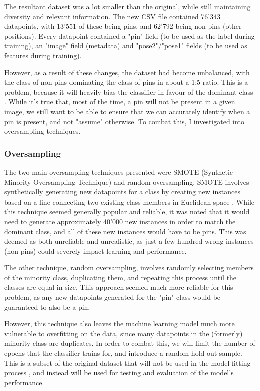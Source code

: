 \documentclass[a4paper, oneside, 11pt]{article}
\begin{document}
\bigskip
\noindent
The resultant dataset was a lot smaller than the original, while still maintaining diversity and relevant information. The new CSV file contained 76'343 datapoints, with 13'551 of these being pins, and 62'792 being non-pins (other positions). Every datapoint contained a "pin" field (to be used as the label during training), an "image" field (metadata) and "pose2"/"pose1" fields (to be used as features during training).

\bigskip
\noindent
However, as a result of these changes, the dataset had become unbalanced, with the class of non-pins dominating the class of pins in about a 1:5 ratio. This is a problem, because it will heavily bias the classifier in favour of the dominant class \cite{ImbalancedDataset}. While it's true that, most of the time, a pin will not be present in a given image, we still want to be able to ensure that we can accurately identify when a pin is present, and not "assume" otherwise. To combat this, I investigated into oversampling techniques.

\subsubsection{Oversampling}

The two main oversampling techniques presented were SMOTE (Synthetic Minority Oversampling Technique) and random oversampling. SMOTE involves synthetically generating new datapoints for a class by creating new instances based on a line connecting two existing class members in Euclidean space \cite{SMOTE}. While this technique seemed generally popular and reliable, it was noted that it would need to generate approximately 40'000 new instances in order to match the dominant class, and all of these new instances would have to be pins. This was deemed as both unreliable and unrealistic, as just a few hundred wrong instances (non-pins) could severely impact learning and performance.

\bigskip
\noindent
The other technique, random oversampling, involves randomly selecting members of the minority class, duplicating them, and repeating this process until the classes are equal in size. This approach seemed much more reliable for this problem, as any new datapoints generated for the "pin" class would be guaranteed to also be a pin.

\bigskip
\noindent
However, this technique also leaves the machine learning model much more vulnerable to overfitting on the data, since many datapoints in the (formerly) minority class are duplicates. In order to combat this, we will limit the number of epochs that the classifier trains for, and introduce a random hold-out sample. This is a subset of the original dataset that will not be used in the model fitting process \cite{HoldOut}, and instead will be used for testing and evaluation of the model's performance.
\end{document}
